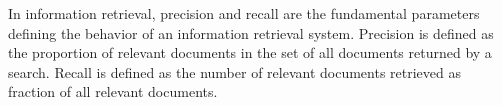 \documentclass[12pt]{article}
\begin{document}
In information retrieval, precision and recall are the fundamental parameters defining the behavior of an information retrieval system. Precision is defined as the proportion of relevant documents in the set of all documents returned by a search. Recall is defined as the number of relevant documents retrieved as fraction of all relevant documents.
\end{document}
